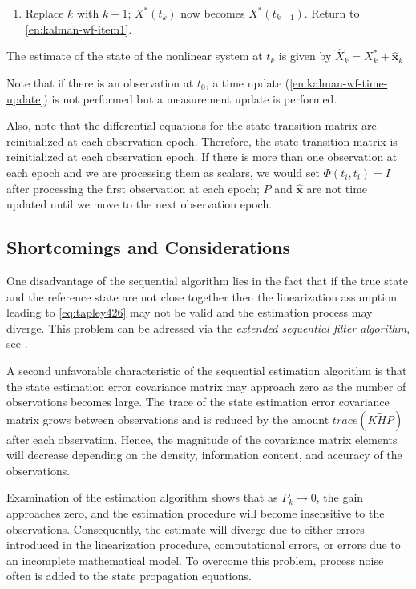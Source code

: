 \begin{enumerate}
  \item Replace \(k\) with \(k+1\); \(X^*(t_k)\) now becomes \(X^*(t_{k-1})\).
  Return to \ref{en:kalman-wf-item1}.

\end{enumerate}

The estimate of the state of the nonlinear system at \(t_k\) is given by 
\(\hat{X}_k = X^*_k + \hat{\bm{x}}_k\)

Note that if there is an observation at \(t_0\), a time update (\ref{en:kalman-wf-time-update}) is not performed but a measurement update is performed.

Also, note that the differential equations for the state transition matrix
are reinitialized at each observation epoch. Therefore, the state transition matrix
is reinitialized at each observation epoch. If there is more than one observation
at each epoch and we are processing them as scalars, we would set \(\Phi (t_i , t_i ) = I\)
after processing the first observation at each epoch; \(P\) and \(\hat{\bm{x}}\) are not
time updated until we move to the next observation epoch. 

\subsection{Shortcomings and Considerations}
One disadvantage of the sequential algorithm lies in the fact that if the true state 
and the reference state are not close together then the linearization assumption 
leading to \ref{eq:tapley426} may not be valid and the estimation process may diverge.
This problem can be adressed via the \emph{extended sequential filter algorithm}, see 
\cite{tapley}.

A second unfavorable characteristic of the sequential estimation algorithm is
that the state estimation error covariance matrix may approach zero as the number
of observations becomes large. The trace of the state estimation error covariance 
matrix grows between observations and is reduced by the amount \(trace(K\tilde{H}\bar{P})\) 
after each observation. Hence, the magnitude of the covariance matrix elements 
will decrease depending on the density, information content, and accuracy of the 
observations.

Examination of the estimation algorithm shows that as \(P_k \to 0\), the gain 
approaches zero, and the estimation procedure will become insensitive to the 
observations. Consequently, the estimate will diverge due to either errors introduced 
in the linearization procedure, computational errors, or errors due to an incomplete 
mathematical model. To overcome this problem, process noise often is added to 
the state propagation equations.

